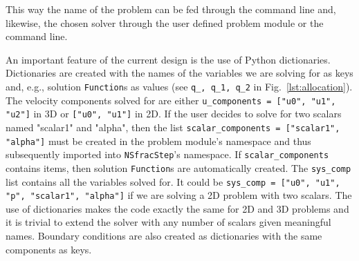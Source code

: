 \documentclass[final,3p,times,twocolumn]{elsarticle}
\newcommand{\inpyth}{\lstinline[style=inlinestyle]} %[]%
\begin{document}
\noindent This way the name of the problem can be fed through the command line and, likewise, the chosen solver through the user defined problem module or the command line.

An important feature of the current design is the use of Python dictionaries. Dictionaries are created with the names of the variables we are solving for as keys and, e.g., solution \inpyth{Function}s as values (see \inpyth{q_, q_1, q_2} in Fig.~\ref{lst:allocation}). The velocity components solved for are either \inpyth{u_components = ["u0", "u1", "u2"]} in 3D or \inpyth{["u0", "u1"]} in 2D. If the user decides to solve for two scalars named "scalar1" and "alpha", then the list \inpyth{scalar_components = ["scalar1", "alpha"]} must be created in the problem module's namespace and thus subsequently imported into \inpyth{NSfracStep}'s namespace. If \inpyth{scalar_components} contains items, then solution \inpyth{Function}s are automatically created. The \inpyth{sys_comp} list contains all the variables solved for. It could be \inpyth{sys_comp = ["u0", "u1", "p", "scalar1", "alpha"]} if we are solving a 2D problem with two scalars. The use of dictionaries makes the code exactly the same for 2D and 3D problems and it is trivial to extend the solver with any number of scalars given meaningful names. Boundary conditions are also created as dictionaries with the same components as keys. 
\end{document}

